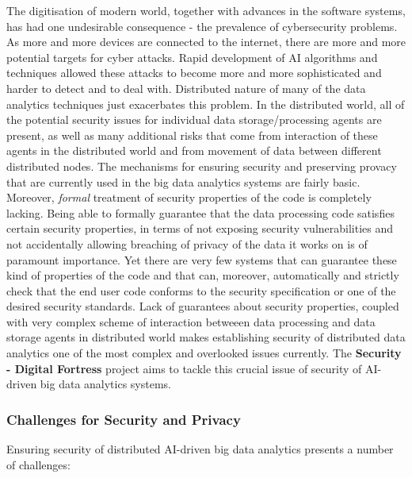 \documentclass[a4paper,11pt]{article}
\newcommand{\project}[1]{\textbf{#1}\xspace}
\newcommand{\SECURITY}{\project{Security - Digital Fortress}}
\newcommand{\TheProject}{\SECURITY}
\begin{document}
The digitisation of modern world, together with advances in the software systems, has had one undesirable consequence - the prevalence of cybersecurity problems. As more and more devices are connected to the internet, there are more and more potential targets for cyber attacks. Rapid development of AI algorithms and techniques allowed these attacks to become more and more sophisticated and harder to detect and to deal with. Distributed nature of many of the data analytics techniques just exacerbates this problem. In the distributed world, all of the potential security issues for individual data storage/processing agents are present, as well as many additional risks that come from interaction of these agents in the distributed world and from movement of data between different distributed nodes. The mechanisms for ensuring security and preserving provacy that are currently used in the big data analytics systems are fairly basic. Moreover, \emph{formal} treatment of security properties of the code is completely lacking. Being able to formally guarantee that the data processing code satisfies certain security properties, in terms of not exposing security vulnerabilities and not accidentally allowing breaching of privacy of the data it works on is of paramount importance. Yet there are very few systems that can guarantee these kind of properties of the code and that can, moreover, automatically and strictly check that the end user code conforms to the security specification or one of the desired security standards. Lack of guarantees about security properties, coupled with very complex scheme of interaction betweeen data processing and data storage agents in distributed world makes establishing security of distributed data analytics one of the most complex and overlooked issues currently. The \TheProject{} project aims to tackle this crucial issue of security of AI-driven big data analytics systems.




\subsubsection{Challenges for Security and Privacy}

Ensuring security of distributed AI-driven big data analytics presents a number of challenges:
\end{document}
